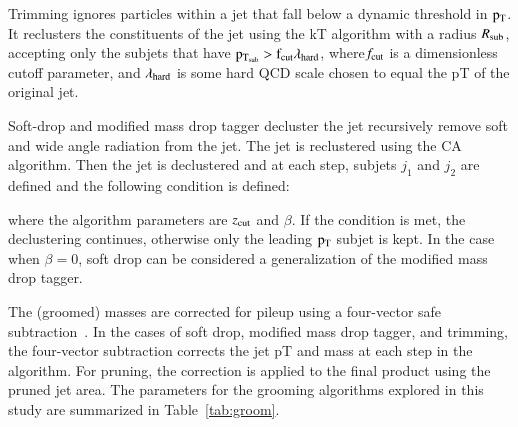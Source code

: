 Trimming ignores particles within a jet that fall below a dynamic threshold in $\rm p_{T}$. 
It reclusters the constituents of the jet using the kT algorithm with a radius $R_{\rm sub}$, accepting only the subjets that have $\rm p_{T_{sub}} > f_{\rm cut} \lambda_{\rm hard}$, where$ f_{\rm cut}$ is a dimensionless cutoff parameter, and $\lambda_{\rm hard}$ is some hard QCD scale chosen to equal the pT of the original jet. 






Soft-drop and modified mass drop tagger decluster the jet recursively remove soft and wide angle radiation from the jet.
The jet is reclustered using the CA algorithm.  Then the jet is declustered and at each step, subjets $j_1$ and $j_2$ are defined and the following condition is defined:



where the algorithm parameters are $z_{\rm cut}$ and $\beta$.
If the condition is met, the declustering continues, otherwise only the leading $\rm p_{T}$ subjet is kept.
In the case when $\beta=0$, soft drop can be considered a generalization of the modified mass drop tagger.  

The (groomed) masses are corrected for pileup using a four-vector safe subtraction~\cite{Cacciari:2014jta}.
In the cases of soft drop, modified mass drop tagger, and trimming, the four-vector subtraction corrects the jet pT and mass at each step in the algorithm.
For pruning, the correction is applied to the final product using the pruned jet area. 
The parameters for the grooming algorithms explored in this study are summarized in Table~\ref{tab:groom}.



